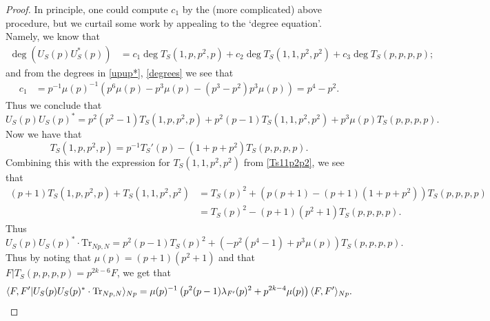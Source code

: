 \documentclass[11pt]{amsart}
\numberwithin{equation}{section}
\theoremstyle{plain}
\theoremstyle{definition}
\newcommand{\mrm}{\mathrm}
\newcommand{\lan}{\langle }
\newcommand{\ran}{\rangle}
\begin{document}
\begin{proof}
In principle, one could compute $c_1$ by the (more complicated) above procedure, but we curtail some work by appealing to the `degree equation'. Namely, we know that
\begin{align}\label{sumdegree}
 \deg(U_S(p) U_S^*(p)) &= c_1 \deg T_S(1,p,p^2,p) + c_2 \deg T_S(1,1,p^2,p^2) +c_3 \deg T_S(p,p,p,p);
\end{align}
and from the degrees in \eqref{upup*}, \eqref{degrees} we see that
\begin{equation}
\begin{split}
    c_1&= p^{-1}\mu(p)^{-1}\left(p^6\mu(p)- p^3\mu(p) - (p^3-p^2) p^3 \mu(p)\right)= p^4-p^2.
    \end{split}
\end{equation}
Thus we conclude that 
\begin{equation}
    U_S(p)U_S(p)^*= p^2(p^2-1) T_S(1, p, p^2, p) +p^2(p-1) T_S(1,1,p^2,p^2)+p^3\mu(p) T_S(p,p,p,p).
\end{equation}
Now we have that
\begin{equation}
    T_S(1,p,p^2,p) = p^{-1}T_S'(p)-(1+p+p^2)T_S(p,p,p,p). \label{TS1pp2p}
\end{equation}
Combining this with the expression for $T_S(1,1,p^2,p^2)$ from \eqref{Ts11p2p2}, we see that
\begin{align}
    (p+1)T_S(1,p,p^2,p)+T_S(1,1,p^2,p^2)&= T_S(p)^2+\left(p(p+1)-(p+1)(1+p+p^2)\right) T_S(p,p,p,p)\nonumber\\
    &= T_S(p)^2- (p+1)(p^2+1) T_S(p,p,p,p).
\end{align}
Thus
\begin{equation}
    U_S(p) U_S(p)^* \cdot \mrm{Tr}_{Np,N}=p^2(p-1) T_S(p)^2 + \left(-p^2(p^4-1)+p^3\mu(p)\right) T_S(p,p,p,p).
\end{equation}
Thus by noting that $\mu(p)=(p+1)(p^2+1)$ and that $F|T_S(p,p,p,p)= p^{2k-6} F$, we get that
\begin{equation}
    \lan F, F'|U_S(p) U_S(p)^* \cdot \mrm{Tr}_{Np,N} \ran_{Np}= \mu(p)^{-1}\left(p^2(p-1) \lambda_{F'}(p)^2 +p^{2k-4}\mu(p)\right)\lan F, F'\ran_{Np}.\qedhere
\end{equation}
\end{proof}
\end{document}
